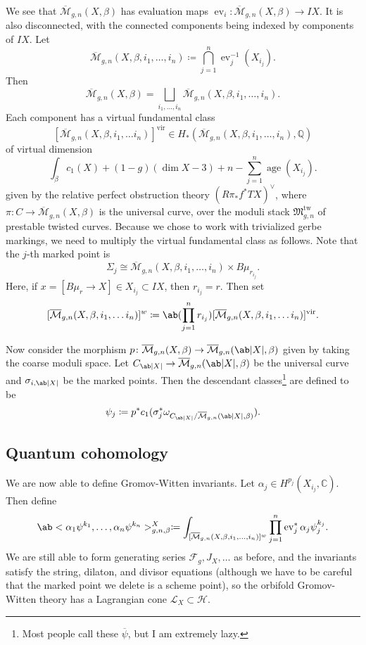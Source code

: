 \documentclass{amsart}
\theoremstyle{definition}
\theoremstyle{remark}
\theoremstyle{plain}
\theoremstyle{definition}
\theoremstyle{remark}
\newcommand{\C}{\mathbb{C}}
\newcommand{\Q}{\mathbb{Q}}
\newcommand{\mc}[1]{\mathcal{#1}}
\newcommand{\mf}[1]{\mathfrak{#1}}
\newcommand{\mr}[1]{\mathrm{#1}}
\newcommand{\on}[1]{\operatorname{#1}}
\newcommand{\ol}[1]{\overline{#1}}
\newcommand{\1}{\mathbf{1}}
\newcommand{\2}{\mathbf{2}}
\newcommand{\3}{\mathbf{3}}
\newcommand{\vir}{\mr{vir}}
\begin{document}
We see that $\ol{\mc{M}}_{g,n}(X,\beta)$ has evaluation maps $\on{ev}_i \colon \ol{\mc{M}}_{g,n}(X,\beta) \to IX$. It is also disconnected, with the connected components being indexed by components of $IX$. Let
\[ \ol{\mc{M}}_{g,n}(X,\beta,i_1,\ldots,i_n) \coloneqq \bigcap_{j=1}^n \on{ev}_j^{-1}(X_{i_j}). \]
Then
\[ \ol{\mc{M}}_{g,n}(X,\beta) = \bigsqcup_{i_1, \ldots, i_n} \ol{\mc{M}}_{g,n}(X,\beta,i_1,\ldots,i_n). \]
Each component has a virtual fundamental class
\[ [\ol{\mc{M}}_{g,n}(X,\beta,i_1, \ldots i_n)]^{\vir} \in H_*(\ol{\mc{M}}_{g,n}(X,\beta,i_1,\ldots, i_n), \Q) \]
of virtual dimension
\[ \int_{\beta} c_1(X) + (1-g)(\dim X - 3) + n - \sum_{j=1}^n \on{age}(X_{i_j}). \]
given by the relative perfect obstruction theory $(R \pi_* f^* TX)^{\vee}$, where $\pi \colon C \to \ol{\mc{M}}_{g,n}(X,\beta)$ is the universal curve, over the moduli stack $\mf{M}_{g,n}^{\mr{tw}}$ of prestable twisted curves. Because we chose to work with trivialized gerbe markings, we need to multiply the virtual fundamental class as follows. Note that the $j$-th marked point is 
\[ \Sigma_{j} \cong \ol{\mc{M}}_{g,n}(X,\beta,i_1,\ldots,i_n) \times B\mu_{r_{i_j}}. \] 
Here, if $x = [B\mu_r \to X] \in X_{i_j} \subset IX$, then $r_{i_j} = r$. Then set
\[  [\ol{\mc{M}}_{g,n}(X,\beta,i_1, \ldots i_n)]^{w} \coloneqq \ab(\prod_{j=1}^n r_{i_j}) [\ol{\mc{M}}_{g,n}(X,\beta,i_1, \ldots i_n)]^{\vir}. \]

Now consider the morphism $p \colon \ol{\mc{M}}_{g,n}(X,\beta) \to \ol{\mc{M}}_{g,n}(\ab|X|,\beta)$ given by taking the coarse moduli space. Let $C_{\ab|X|} \to \ol{\mc{M}}_{g,n}(\ab|X|,\beta)$ be the universal curve and $\sigma_{i,\ab|X|}$ be the marked points. Then the descendant classes\footnote{Most people call these $\ol{\psi}$, but I am extremely lazy.} are defined to be
\[ \psi_j \coloneqq p^* c_1(\sigma_j^* \omega_{C_{\ab|X|} / \ol{\mc{M}}_{g,n}(\ab|X|,\beta)}). \]

\subsection{Quantum cohomology}%
\label{sub:Quantum cohomology}

We are now able to define Gromov-Witten invariants. Let $\alpha_j \in H^{p_j}(X_{i_j}, \C)$. Then define
\[ \ab<\alpha_1 \psi^{k_1},\ldots,\alpha_n \psi^{k_n}>_{g,n,\beta}^X \coloneqq \int_{[ \ol{\mc{M}}_{g,n}(X,\beta,i_1,\ldots,i_n) ]^w} \prod_{j=1}^n \on{ev}_j^* \alpha_j \psi_j^{k_j}. \]
We are still able to form generating series $\mc{F}_g, J_X,\ldots$ as before, and the invariants satisfy the string, dilaton, and divisor equations (although we have to be careful that the marked point we delete is a scheme point), so the orbifold Gromov-Witten theory has a Lagrangian cone $\mc{L}_X \subset \mc{H}$.
\end{document}
